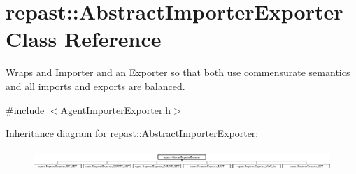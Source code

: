 \hypertarget{classrepast_1_1_abstract_importer_exporter}{\section{repast\-:\-:Abstract\-Importer\-Exporter Class Reference}
\label{classrepast_1_1_abstract_importer_exporter}
}


Wraps and Importer and an Exporter so that both use commensurate semantics and all imports and exports are balanced.  




{\ttfamily \#include $<$Agent\-Importer\-Exporter.\-h$>$}

Inheritance diagram for repast\-:\-:Abstract\-Importer\-Exporter\-:\begin{figure}[H]
\begin{center}
\leavevmode
\includegraphics[height=0.787623cm]{classrepast_1_1_abstract_importer_exporter}
\end{center}
\end{figure}

